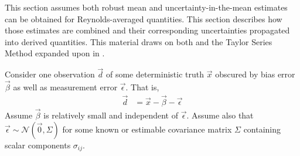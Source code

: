 \documentclass[letterpaper,11pt,nointlimits,reqno,draft]{amsbook}
\begin{document}
This section assumes both robust mean and uncertainty-in-the-mean estimates can
be obtained for Reynolds-averaged quantities.  This section describes how those
estimates are combined and their corresponding uncertainties propagated into
derived quantities.  This material draws on both \citet{Ku1966Notes} and the
Taylor Series Method expanded upon in \citet{Coleman2009Experimentation}.

Consider one observation $\vec{d}$  of some deterministic truth $\vec{x}$
obscured by bias error $\vec{\beta}$ as well as measurement error
$\vec{\epsilon}$. That is,
\begin{align}
  \vec{d} &= \vec{x} - \vec{\beta} - \vec{\epsilon}
\end{align}
Assume $\vec{\beta}$ is relatively small and independent of $\vec{\epsilon}$.
Assume also that $\vec{\epsilon} \sim \mathcal{N}(\vec{0}, \Sigma)$ for some
known or estimable covariance matrix $\Sigma$ containing scalar components
$\sigma_{ij}$.
\end{document}
